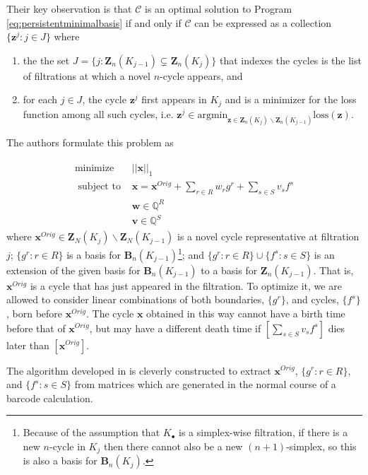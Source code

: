 \documentclass[utf8]{formatting_stuff/frontiersFPHY}
\newcommand{\Q}{\mathbb{Q}}
\newcommand{\Boundaries}[0]{\mathbf{B}}
\newcommand{\Cycles}[0]{\mathbf{Z}}
\newcommand{\originalrep}{\mathbf{x}^{Orig}}
\newcommand{\optimalrep}{\mathbf{x}}
\newcommand{\cycle}{{\mathbf z}}
\newcommand{\boundingchain}{\mathbf{w}}
\newcommand{\loss}{\mathrm{loss}}
\newcommand{\argmin}{\mathrm{argmin}}
\newcommand{\fcyclebasis}{\mathcal{C}}
\newcommand{\pr}{Program }
\theoremstyle{plain}
\theoremstyle{definition}
\begin{document}
 
Their key observation is that $\fcyclebasis$ is an optimal solution to \pr \eqref{eq:persistentminimalbasis} if and only if $\fcyclebasis$ can be expressed as a collection $\{\cycle^j : j \in J\}$ where  \begin{enumerate}
    \item the the set $J = \{j :  \Cycles_n(K_{j-1}) \subsetneq \Cycles_n(K_j) \}$ that indexes the cycles is the list of filtrations at which a novel $n$-cycle appears, and
    \item for each $j \in J$, the cycle $\cycle^j$ first appears in $K_j$ and is a minimizer for the loss function among all such cycles, i.e. $\cycle^j \in \argmin_{\cycle \in \Cycles_n(K_j) \backslash \Cycles_n(K_{j-1})} \loss(\cycle).$
\end{enumerate}
The authors formulate this problem as 

 
\begin{align}
\begin{split}
\text{minimize } & ||\mathbf{x} ||_1  \\
\text{ subject to } & \mathbf{x} = \originalrep + \sum_{r\in R} w_r g^r + \sum_{s \in S} v_s f^s \\
& \boundingchain \in \Q^R  \\
& \mathbf{v} \in \Q^S
\end{split}
\label{eq:escolarargmin}
\end{align}
where $\originalrep \in\Cycles_N(K_j) \backslash \Cycles_N(K_{j-1})$ is a novel cycle representative at filtration $j$; $\{g^r : r \in R\}$ is a basis for $\Boundaries_n(K_{j-1})$\footnote{Because of the assumption that $K_\bullet$ is a simplex-wise filtration, if there is a new $n$-cycle in $K_j$ then there cannot also be a new $(n+1)$-simplex, so this is also a basis for $\Boundaries_n(K_j).$}; and $\{g^r : r \in R\} \cup \{f^s : s \in S\}$ is an extension of the given basis for $\Boundaries_n(K_{j-1})$ to a basis for $\Cycles_n(K_{j-1})$. That is, $\originalrep$ is a cycle that has just appeared in the filtration. To optimize it, we are allowed to consider linear combinations of both boundaries, $\{g^r\}$, and cycles, $\{f^s\}$, born before $\originalrep.$ The cycle $\optimalrep$ obtained in this way cannot have a birth time before that of $\originalrep$, but may have a different death time if $[\sum_{s\in S}v_sf^s]$ dies later than $[\originalrep]$. 

 

The algorithm developed in \cite{Escolar2016} is cleverly constructed to extract $\originalrep$, $\{g^r : r \in R\}$, and $\{f^s : s \in S\}$ from matrices which are generated in the normal course of a barcode calculation.
\end{document}
